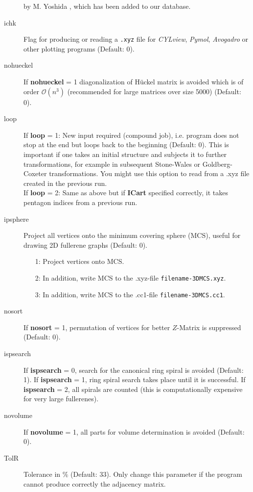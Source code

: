 \documentclass[article,a4paper,twoside]{memoir}
\newcommand{\program}[1]{\textit{#1}}
\newcommand{\filename}[1]{\texttt{#1}}
\newcommand{\paramname}[1]{{\color{green}\textbf{#1}}}
\begin{document}
\begin{description}
  by M. Yoshida \cite{Yoshida}, which has been added to our database.
\item[{ichk}] Flag for producing or reading a \filename{.xyz} file for \program{CYLview}, \program{Pymol}, 
  \program{Avogadro} or other plotting programs (Default: 0).\\
\item[{nohueckel}]  If \paramname{nohueckel} = 1 diagonalization of H\"uckel matrix is avoided which is of order $\mathcal{O}(n^3)$ (recommended for large matrices over size 5000) (Default: 0).
\item[{loop}] 
  If \paramname{loop} = 1: New input required (compound job), i.e. program does not stop at the end but loops back to the beginning (Default: 0). 
  This is important if one takes an initial structure and subjects it to further transformations, for example in subsequent Stone-Wales or
  Goldberg-Coxeter transformations. You might use this option to read from a .xyz file created in the previous run.\\
  If \paramname{loop} = 2: Same as above but if \paramname{ICart} specified correctly, it takes pentagon indices from a previous run.
\item[{ipsphere}] 
  Project all vertices onto the minimum covering sphere (MCS), useful for drawing 2D fullerene graphs (Default: 0).
  \begin{enumerate}
  \item[1:] Project vertices onto MCS.
  \item[2:] In addition, write MCS to the .xyz-file \filename{filename-3DMCS.xyz}.
  \item[3:] In addition, write MCS to the .cc1-file \filename{filename-3DMCS.cc1}.
  \end{enumerate}
\item[{nosort}] If \paramname{nosort} = 1, permutation of vertices for better $Z$-Matrix is suppressed (Default: 0).
\item[{ispsearch}] If \paramname{ispsearch} = 0, search for the canonical ring spiral is avoided  (Default: 1). If \paramname{ispsearch} = 1, ring spiral search takes place
until it is successful. If \paramname{ispsearch} = 2, all spirals are counted (this is computationally expensive for very large fullerenes). 
\item[{novolume}] If \paramname{novolume} = 1, all parts for volume determination is avoided  (Default: 0).
\item[{TolR}] Tolerance in \% (Default: 33). Only change this parameter if the program cannot produce correctly the adjacency matrix. 

\end{description}
\end{document}
